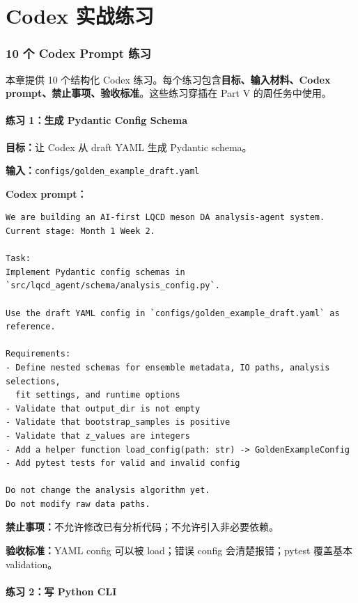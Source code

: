 \documentclass[11pt,a4paper,fontset=fandol]{ctexart}
\begin{document}
\newpage
\part{Codex 实战练习}

\section{10 个 Codex Prompt 练习}

本章提供 10 个结构化 Codex 练习。每个练习包含\textbf{目标、输入材料、Codex prompt、禁止事项、验收标准}。这些练习穿插在 Part V 的周任务中使用。

\subsection{练习 1：生成 Pydantic Config Schema}

\textbf{目标：}让 Codex 从 draft YAML 生成 Pydantic schema。

\textbf{输入：}\texttt{configs/golden\_example\_draft.yaml}

\textbf{Codex prompt：}
\begin{lstlisting}
We are building an AI-first LQCD meson DA analysis-agent system.
Current stage: Month 1 Week 2.

Task:
Implement Pydantic config schemas in `src/lqcd_agent/schema/analysis_config.py`.

Use the draft YAML config in `configs/golden_example_draft.yaml` as reference.

Requirements:
- Define nested schemas for ensemble metadata, IO paths, analysis selections, 
  fit settings, and runtime options
- Validate that output_dir is not empty
- Validate that bootstrap_samples is positive
- Validate that z_values are integers
- Add a helper function load_config(path: str) -> GoldenExampleConfig
- Add pytest tests for valid and invalid config

Do not change the analysis algorithm yet.
Do not modify raw data paths.
\end{lstlisting}

\textbf{禁止事项：}不允许修改已有分析代码；不允许引入非必要依赖。

\textbf{验收标准：}YAML config 可以被 load；错误 config 会清楚报错；pytest 覆盖基本 validation。

\subsection{练习 2：写 Python CLI}
\end{document}
